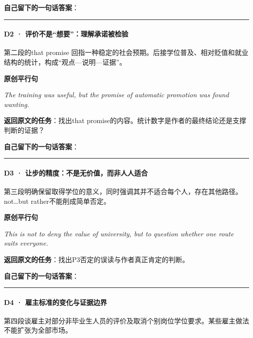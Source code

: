 \documentclass[
  11pt,
]{ctexart}
\renewenvironment{quote}{\begin{tcolorbox}[enhanced,breakable,colback=sand,colframe=primary!22,boxrule=0.4pt,arc=2pt,left=2.6mm,right=2.6mm,top=1.6mm,bottom=1.6mm]\itshape}{\end{tcolorbox}}
\begin{document}
\textbf{自己留下的一句话答案}：

\rule{0.75\linewidth}{0.35pt}

\paragraph{D2 ·
评价不是``想要''：理解承诺被检验}\label{d2-ux8bc4ux4ef7ux4e0dux662fux60f3ux8981ux7406ux89e3ux627fux8bfaux88abux68c0ux9a8c}

第二段的that promise
回指一种稳定的社会预期。后接学位普及、相对贬值和就业结构的统计，构成``观点---说明---证据''。

\textbf{原创平行句}

\begin{quote}
The training was useful, but the promise of automatic promotion was
found wanting.
\end{quote}

\textbf{返回原文的任务}：找出that
promise的内容。统计数字是作者的最终结论还是支撑判断的证据？

\textbf{自己留下的一句话答案}：

\rule{0.75\linewidth}{0.35pt}

\paragraph{D3 ·
让步的精度：不是无价值，而非人人适合}\label{d3-ux8ba9ux6b65ux7684ux7cbeux5ea6ux4e0dux662fux65e0ux4ef7ux503cux800cux975eux4ebaux4ebaux9002ux5408}

第三段明确保留取得学位的意义，同时强调其并不适合每个人，存在其他路径。not\ldots but
rather不能削成简单否定。

\textbf{原创平行句}

\begin{quote}
This is not to deny the value of university, but to question whether one
route suits everyone.
\end{quote}

\textbf{返回原文的任务}：找出P3否定的误读与作者真正肯定的判断。

\textbf{自己留下的一句话答案}：

\rule{0.75\linewidth}{0.35pt}

\paragraph{D4 ·
雇主标准的变化与证据边界}\label{d4-ux96c7ux4e3bux6807ux51c6ux7684ux53d8ux5316ux4e0eux8bc1ux636eux8fb9ux754c}

第四段谈雇主对部分非毕业生人员的评价及取消个别岗位学位要求。某些雇主做法不能扩张为全部市场。
\end{document}
